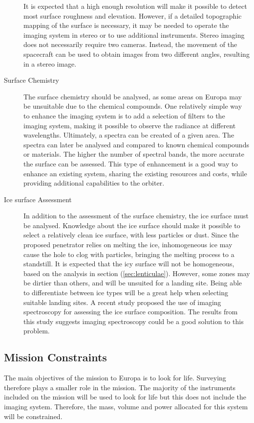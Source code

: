 \begin{description}
It is expected that a high enough resolution will make it possible to detect most surface roughness and elevation. However, if a detailed topographic mapping of the surface is necessary, it may be needed to operate the imaging system in stereo or to use additional instruments. Stereo imaging does not necessarily require two cameras. Instead, the movement of the spacecraft can be used to obtain images from two different angles, resulting in a stereo image. 
\item[Surface Chemistry]
The surface chemistry should be analysed, as some areas on Europa may be unsuitable due to the chemical compounds. One relatively simple way to enhance the imaging system is to add a selection of filters to the imaging system, making it possible to observe the radiance at different wavelengths. Ultimately, a spectra can be created of a given area. The spectra can later be analysed and compared to known chemical compounds or materials. The higher the number of spectral bands, the more accurate the surface can be assessed. This type of enhancement is a good way to enhance an existing system, sharing the existing resources and costs, while providing additional capabilities to the orbiter.
\item[Ice surface Assessment]
In addition to the assessment of the surface chemistry, the ice surface must be analysed. Knowledge about the ice surface should make it possible to select a relatively clean ice surface, with less particles or dust. Since the proposed penetrator relies on melting the ice, inhomogeneous ice may cause the hole to clog with particles, bringing the melting process to a standstill. It is expected that the icy surface will not be homogeneous, based on the analysis in section (\ref{sec:lenticulae}). However, some zones may be dirtier than others, and will be unsuited for a landing site. Being able to differentiate between ice types will be a great help when selecting suitable landing sites. A recent study \cite{naegeli2015a} proposed the use of imaging spectroscopy for assessing the ice surface composition. The results from this study suggests imaging spectroscopy could be a good solution to this problem.
\end{description}
\subsection{Mission Constraints}
The main objectives of the mission to Europa is to look for life. Surveying therefore plays a smaller role in the mission. The majority of the instruments included on the mission will be used to look for life but this does not include the imaging system. Therefore, the mass, volume and power allocated for this system will be constrained.

